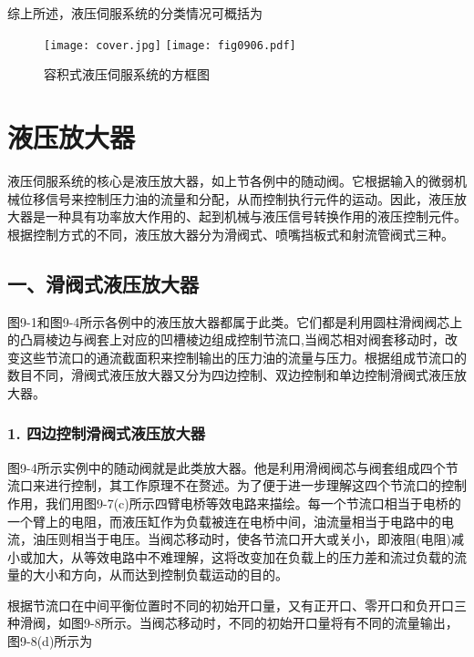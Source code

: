     综上所述，液压伺服系统的分类情况可概括为

\begin{figure}
\centering
\ifOpenSource
\texttt{[image: cover.jpg]}
\else
\texttt{[image: fig0906.pdf]}
\fi
\caption{容积式液压伺服系统的方框图}
\label{fig:fig0906}
\end{figure}


\section{液压放大器}


    液压伺服系统的核心是液压放大器，如上节各例中的随动阀。它根据输入的微弱机械位移信号来控制压力油的流量和分配，从而控制执行元件的运动。因此，液压放大器是一种具有功率放大作用的、起到机械与液压信号转换作用的液压控制元件。根据控制方式的不同，液压放大器分为滑阀式、喷嘴挡板式和射流管阀式三种。

\subsection{一、滑阀式液压放大器}

	图9-1和图9-4所示各例中的液压放大器都属于此类。它们都是利用圆柱滑阀阀芯上的凸肩棱边与阀套上对应的凹槽棱边组成控制节流口,当阀芯相对阀套移动时，改变这些节流口的通流截面积来控制输出的压力油的流量与压力。根据组成节流口的数目不同，滑阀式液压放大器又分为四边控制、双边控制和单边控制滑阀式液压放大器。

\subsubsection{1. 四边控制滑阀式液压放大器}

	图9-4所示实例中的随动阀就是此类放大器。他是利用滑阀阀芯与阀套组成四个节流口来进行控制，其工作原理不在赘述。为了便于进一步理解这四个节流口的控制作用，我们用图9-7(c)所示四臂电桥等效电路来描绘。每一个节流口相当于电桥的一个臂上的电阻，而液压缸作为负载被连在电桥中间，油流量相当于电路中的电流，油压则相当于电压。当阀芯移动时，使各节流口开大或关小，即液阻(电阻)减小或加大，从等效电路中不难理解，这将改变加在负载上的压力差和流过负载的流量的大小和方向，从而达到控制负载运动的目的。

	根据节流口在中间平衡位置时不同的初始开口量，又有正开口、零开口和负开口三种滑阀，如图9-8所示。当阀芯移动时，不同的初始开口量将有不同的流量输出，图9-8(d)所示为
